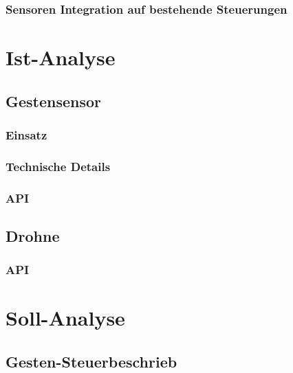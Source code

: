 \subsubsection{Sensoren Integration auf bestehende Steuerungen}


\section{Ist-Analyse}
\subsection{Gestensensor}

\subsubsection{Einsatz}

\subsubsection{Technische Details}

\subsubsection{API}


\subsection{Drohne}

\subsubsection{API}


\section{Soll-Analyse}
\subsection{Gesten-Steuerbeschrieb}


